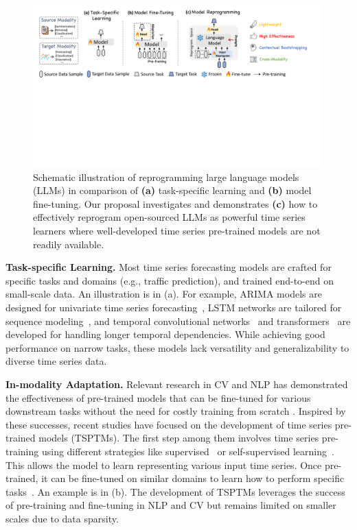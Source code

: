 \begin{figure}[htbp]
    \centering
    \includegraphics[width=0.99\textwidth]{figures/schematic_illustration_v5.pdf}\vspace{-2mm}
    \caption{Schematic illustration of reprogramming large language models (LLMs) in comparison of \textbf{(a)} task-specific learning and \textbf{(b)} model fine-tuning. Our proposal investigates and demonstrates \textbf{(c)} how to effectively reprogram open-sourced LLMs as powerful time series learners where well-developed time series pre-trained models are not readily available.
    }
    \vspace{-5mm}
    \label{fig:schematic}
\end{figure}

\noindent\textbf{Task-specific Learning.} Most time series forecasting models are crafted for specific tasks and domains (e.g., traffic prediction), and trained end-to-end on small-scale data. An illustration is in (a). For example, ARIMA models are designed for univariate time series forecasting~\citep{box2015time}, LSTM networks are tailored for sequence modeling~\citep{hochreiter1997long}, and temporal convolutional networks~\citep{bai2018empirical} and transformers~\citep{wen2023transformers} are developed for handling longer temporal dependencies. While achieving good performance on narrow tasks, these models lack versatility and generalizability to diverse time series data.

\noindent\textbf{In-modality Adaptation.} 
Relevant research in CV and NLP has demonstrated the effectiveness of pre-trained models that can be fine-tuned for various downstream tasks without the need for costly training from scratch \citep{devlin2018bert,brown2020language,touvron2023llama}. Inspired by these successes, recent studies have focused on the development of time series pre-trained models (TSPTMs). The first step among them involves time series pre-training using different strategies like supervised~\citep{fawaz2018transfer} or self-supervised learning~\citep{zhang2022self,deldari2022beyond,zhang2023self}. This allows the model to learn representing various input time series. Once pre-trained, it can be fine-tuned on similar domains to learn how to perform specific tasks~\citep{tang2022domain}. An example is in (b). The development of TSPTMs leverages the success of pre-training and fine-tuning in NLP and CV but remains limited on smaller scales due to data sparsity.

